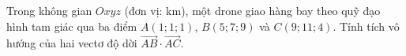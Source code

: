 \begin{ex}
Trong không gian $Oxyz$ (đơn vị: km), một drone giao hàng bay theo quỹ đạo hình tam giác qua ba điểm $A(1;1;1)$, $B(5;7;9)$ và $C(9;11;4)$. Tính tích vô hướng của hai vectơ độ dời $\overrightarrow{AB}\cdot\overrightarrow{AC}$.
\end{ex}
